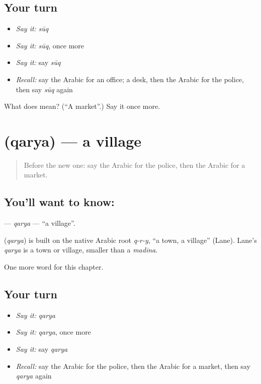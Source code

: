 \subsection*{Your turn}
\begin{itemize}
\raggedright
  \item \emph{Say it:} \emph{sūq}
  \item \emph{Say it:} \emph{sūq}, once more
  \item \emph{Say it:} say \emph{sūq}
  \item \emph{Recall:} say the Arabic for an office; a desk, then the Arabic for the police, then say \emph{sūq} again
\end{itemize}

\begin{tcolorbox}[breakable,colback=teal!4,colframe=teal!35!black,title={Before you move on}]
What does  mean? (\textquotedblleft{}A market\textquotedblright{}.) Say it once more.
\end{tcolorbox}
\section[\texorpdfstring{\ar{قرية} (qarya)}{قرية (qarya)}]{ (qarya) — a village}

\label{lesson:AR-C93-qarya}



\begin{quote}
Before the new one: say the Arabic for the police, then the Arabic for a market.
\end{quote}

\subsection*{You'll want to know: }
\textbf{} — \emph{qarya} — \textquotedblleft{}a village\textquotedblright{}.

\begin{cousinweb}
\textbf{} (\emph{qarya}) is built on the native Arabic root \emph{q-r-y}, \textquotedblleft{}a town, a village\textquotedblright{} (Lane). Lane's \emph{qarya} is a town or village, smaller than a \emph{madīna}.
\end{cousinweb}

\begin{grammarlens}[title={What you've built}]
One more word for this chapter.
\end{grammarlens}

\subsection*{Your turn}
\begin{itemize}
\raggedright
  \item \emph{Say it:} \emph{qarya}
  \item \emph{Say it:} \emph{qarya}, once more
  \item \emph{Say it:} say \emph{qarya}
  \item \emph{Recall:} say the Arabic for the police, then the Arabic for a market, then say \emph{qarya} again
\end{itemize}

